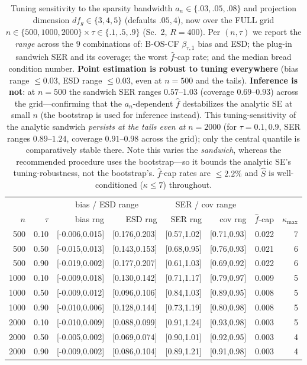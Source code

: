 \begin{table}[t]\centering\small
\caption{Tuning sensitivity to the sparsity bandwidth $a_n\in\{.03,.05,.08\}$ and projection dimension $df_g\in\{3,4,5\}$ (defaults $.05,4$), now over the FULL grid $n\in\{500,1000,2000\}\times\tau\in\{.1,.5,.9\}$ (Sc.\ 2, $R=400$). Per $(n,\tau)$ we report the \emph{range} across the $9$ combinations of: B-OS-CF $\beta_{\tau,1}$ bias and ESD; the plug-in sandwich SER and its coverage; the worst $\widehat f$-cap rate; and the median bread condition number. \textbf{Point estimation is robust to tuning everywhere} (bias range $\le0.03$, ESD range $\le0.03$, even at $n{=}500$ and the tails). \textbf{Inference is not}: at $n{=}500$ the sandwich SER ranges $0.57$--$1.03$ (coverage $0.69$--$0.93$) across the grid---confirming that the $a_n$-dependent $\widehat f$ destabilizes the analytic SE at small $n$ (the bootstrap is used for inference instead). This tuning-sensitivity of the analytic sandwich \emph{persists at the tails even at} $n{=}2000$ (for $\tau{=}0.1,0.9$, SER ranges $0.89$--$1.24$, coverage $0.91$--$0.98$ across the grid); only the central quantile is comparatively stable there. Note this varies the \emph{sandwich}, whereas the recommended procedure uses the bootstrap---so it bounds the analytic SE's tuning-robustness, not the bootstrap's. $\widehat f$-cap rates are $\le2.2\%$ and $\widehat S$ is well-conditioned ($\kappa\le7$) throughout.}
\label{tab:tuning}\begin{tabular}{rr rr rr rr}\toprule
&&\multicolumn{2}{c}{bias / ESD range}&\multicolumn{2}{c}{SER / cov range}&&\\
\cmidrule(lr){3-4}\cmidrule(lr){5-6}
$n$&$\tau$&bias rng&ESD rng&SER rng&cov rng&$\widehat f$-cap&$\kappa_{\max}$\\\midrule
500 & 0.10 & [-0.006,0.015] & [0.176,0.203] & [0.57,1.02] & [0.71,0.93] & 0.022 & 7 \\
500 & 0.50 & [-0.015,0.013] & [0.143,0.153] & [0.68,0.95] & [0.76,0.93] & 0.021 & 6 \\
500 & 0.90 & [-0.019,0.002] & [0.177,0.207] & [0.61,1.03] & [0.69,0.92] & 0.022 & 6 \\
1000 & 0.10 & [-0.009,0.018] & [0.130,0.142] & [0.71,1.17] & [0.79,0.97] & 0.009 & 5 \\
1000 & 0.50 & [-0.009,0.012] & [0.096,0.106] & [0.84,1.03] & [0.89,0.95] & 0.008 & 5 \\
1000 & 0.90 & [-0.010,0.006] & [0.128,0.144] & [0.73,1.19] & [0.80,0.98] & 0.008 & 5 \\
2000 & 0.10 & [-0.010,0.009] & [0.088,0.099] & [0.91,1.24] & [0.93,0.98] & 0.003 & 5 \\
2000 & 0.50 & [-0.005,0.002] & [0.069,0.074] & [0.90,1.01] & [0.92,0.95] & 0.003 & 4 \\
2000 & 0.90 & [-0.009,0.002] & [0.086,0.104] & [0.89,1.21] & [0.91,0.98] & 0.003 & 4 \\
\bottomrule\end{tabular}\end{table}
